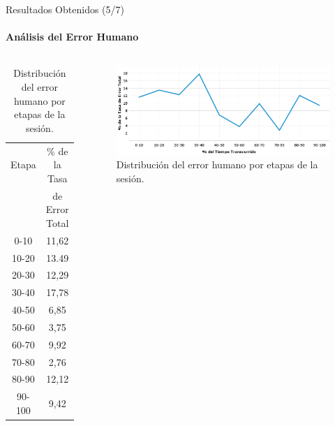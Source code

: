 \begin{frame}{Resultados Obtenidos (5/7)}
\framesubtitle{An\'alisis del Error Humano}

\begin{columns}
\centering
\begin{table}
\tiny
\begin{tabular}{|c|c|}
\hline
    Etapa & \% de la Tasa \\ & de Error Total \\
    \hline
0-10  &  11,62 \\
10-20 &  13.49 \\
20-30 &  12,29 \\
30-40 &  17,78 \\
40-50 &  6,85 \\
50-60 &  3,75 \\
60-70 &  9,92 \\
70-80 &  2,76 \\
80-90 &  12,12 \\
90-100 & 9,42 \\
    \hline
\end{tabular}
\caption{Distribuci\'on del error humano por etapas de la sesi\'on.}
\label{sec:error-tiempo}
\end{table}
\begin{figure}
\centering
\includegraphics[width=1\linewidth]{./graphics/error_tiempo.png}
\caption{Distribuci\'on del error humano por etapas de la sesi\'on.}
\label{figure:gerror-tiempo}
\end{figure}
\end{columns}

\end{frame}

